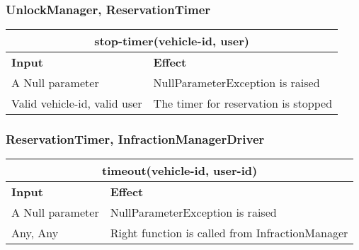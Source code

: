 \subsubsection{UnlockManager, ReservationTimer} 
\begin{tabular}{|p{5cm}|p{7cm}|}
\hline
\multicolumn{2}{|c|}{stop-timer(vehicle-id, user)} \\
\hline
\textbf{Input} & \textbf{Effect} \\

\hline
A Null parameter & NullParameterException is raised \\

\hline
Valid vehicle-id, valid user & The timer for reservation is stopped \\
\hline
\end{tabular}

\subsubsection{ReservationTimer, InfractionManagerDriver} 
\begin{tabular}{|p{5cm}|p{7cm}|}
\hline
\multicolumn{2}{|c|}{timeout(vehicle-id, user-id)} \\
\hline
\textbf{Input} & \textbf{Effect} \\

\hline
A Null parameter & NullParameterException is raised \\

\hline
Any, Any & Right function is called from InfractionManager \\
\hline
\end{tabular}

